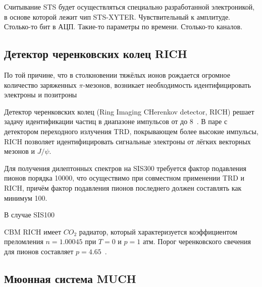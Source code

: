 Считывание STS будет осуществляться специально разработанной электроникой, в основе которой лежит чип STS-XYTER.
Чувствительный к амплитуде.
Столько-то бит в АЦП.
Такие-то параметры по времени.
Столько-то каналов.



\subsection{Детектор черенковских колец RICH}\label{sec:secRICH}

По той причине, что в столкновении тяжёлых ионов рождается огромное количество заряженных $\pi$-мезонов, возникает необходимость идентифицировать электроны и позитроны

Детектор черенковских колец (Ring Imaging CHerenkov detector, RICH) решает задачу идентификации частиц в диапазоне импульсов от до 8~\GeVoverC{}.
В паре с детектором переходного излучения TRD, покрывающем более высокие импульсы, RICH позволяет идентифицировать сигнальные электроны от лёгких векторных мезонов и $J/\psi$.

Для получения дилептонных спектров на SIS300 требуется фактор подавления пионов порядка 10000, что осуществимо при совместном применении TRD и RICH, причём фактор подавления пионов последнего должен составлять как минимум 100.

В случае SIS100 

CBM RICH имеет $CO_{2}$ радиатор, который характеризуется коэффициентом преломления $n=1.00045$ при $T=0$ и $p=1$ атм.
Порог черенковского свечения для пионов составляет $p=4.65$~\GeVoverC.



\subsection{Мюонная система MUCH}\label{sec:secMUCH}



